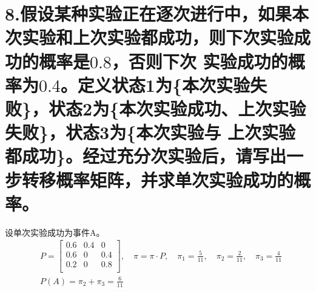 \documentclass[UTF8]{ctexart}
\begin{document}
\section*{8.假设某种实验正在逐次进行中，如果本次实验和上次实验都成功，则下次实验成功的概率是$0.8$，否则下次
  实验成功的概率为$0.4$。定义状态1为\{本次实验失败\}，状态2为\{本次实验成功、上次实验失败\}，状态3为\{本次实验与
  上次实验都成功\}。经过充分次实验后，请写出一步转移概率矩阵，并求单次实验成功的概率。}
设单次实验成功为事件A。
\begin{equation*}
  \begin{aligned}
     & P=\begin{bmatrix}
      0.6 & 0.4 & 0   \\
      0.6 & 0   & 0.4 \\
      0.2 & 0   & 0.8 \\
    \end{bmatrix},\quad\pi=\pi\cdot P,\quad\pi_1=\frac{5}{11},\quad\pi_2=\frac{2}{11},
    \quad\pi_3=\frac{4}{11}                                                                             \\
     & P(A)=\pi_2+\pi_3=\frac{6}{11}                                                                    \\
  \end{aligned}
\end{equation*}
\end{document}
